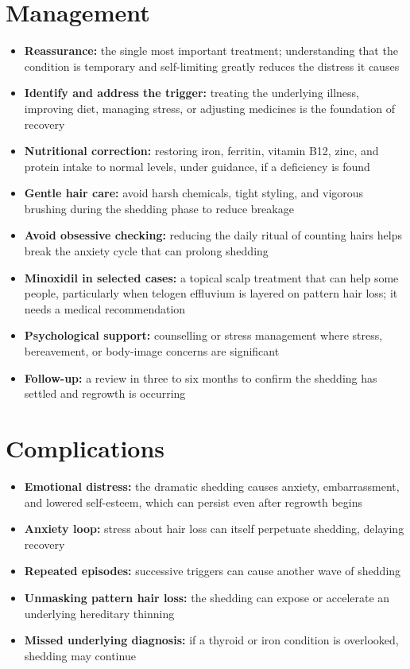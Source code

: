 \section*{Management}
\begin{itemize}
    \item \textbf{Reassurance:} the single most important treatment; understanding that the condition is temporary and self-limiting greatly reduces the distress it causes
    \item \textbf{Identify and address the trigger:} treating the underlying illness, improving diet, managing stress, or adjusting medicines is the foundation of recovery
    \item \textbf{Nutritional correction:} restoring iron, ferritin, vitamin B12, zinc, and protein intake to normal levels, under guidance, if a deficiency is found
    \item \textbf{Gentle hair care:} avoid harsh chemicals, tight styling, and vigorous brushing during the shedding phase to reduce breakage
    \item \textbf{Avoid obsessive checking:} reducing the daily ritual of counting hairs helps break the anxiety cycle that can prolong shedding
    \item \textbf{Minoxidil in selected cases:} a topical scalp treatment that can help some people, particularly when telogen effluvium is layered on pattern hair loss; it needs a medical recommendation
    \item \textbf{Psychological support:} counselling or stress management where stress, bereavement, or body-image concerns are significant
    \item \textbf{Follow-up:} a review in three to six months to confirm the shedding has settled and regrowth is occurring
\end{itemize}

\section*{Complications}
\begin{itemize}
    \item \textbf{Emotional distress:} the dramatic shedding causes anxiety, embarrassment, and lowered self-esteem, which can persist even after regrowth begins
    \item \textbf{Anxiety loop:} stress about hair loss can itself perpetuate shedding, delaying recovery
    \item \textbf{Repeated episodes:} successive triggers can cause another wave of shedding
    \item \textbf{Unmasking pattern hair loss:} the shedding can expose or accelerate an underlying hereditary thinning
    \item \textbf{Missed underlying diagnosis:} if a thyroid or iron condition is overlooked, shedding may continue
\end{itemize}

